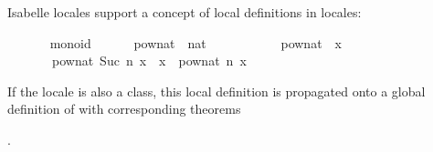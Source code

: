 \begin{isabellebody}
\begin{isamarkuptext}
\end{isamarkuptext}%
\isamarkuptrue%
%
\isamarkuptrue%
%
\begin{isamarkuptext}%
Isabelle locales support a concept of local definitions
  in locales:%
\end{isamarkuptext}%
\isamarkuptrue%
\ \ \ \ \isamarkupfalse%
\ {\isacharparenleft}\ monoid{\isacharparenright}\isanewline
\ \ \ \ \ \ pow{\isacharunderscore}nat\ {\isacharcolon}{\isacharcolon}\ {\isachardoublequoteopen}nat\ {\isasymRightarrow}\ {\isasymalpha}\ {\isasymRightarrow}\ {\isasymalpha}{\isachardoublequoteclose}\ \isanewline
\ \ \ \ \ \ {\isachardoublequoteopen}pow{\isacharunderscore}nat\ {}\ x\ {\isacharequal}\ {\isasymone}{\isachardoublequoteclose}\isanewline
\ \ \ \ \ \ {\isacharbar}\ {\isachardoublequoteopen}pow{\isacharunderscore}nat\ {\isacharparenleft}Suc\ n{\isacharparenright}\ x\ {\isacharequal}\ x\ {\isasymotimes}\ pow{\isacharunderscore}nat\ n\ x{\isachardoublequoteclose}%
\begin{isamarkuptext}%
\noindent If the locale  is also a class, this local
  definition is propagated onto a global definition of
  with corresponding theorems

  .


\end{isamarkuptext}
\end{isabellebody}
